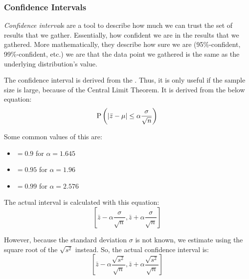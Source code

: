 \subsubsection{Confidence Intervals}\label{subsubsec:Confidence_Intervals}
\begin{definition}\label{def:Confidence_Interval}
  \emph{Confidence interval}s are a tool to describe how much we can trust the set of results that we gather.
  Essentially, how confident we are in the results that we gathered.
  More mathematically, they describe how sure we are (95\%-confident, 99\%-confident, etc.) we are that the data point we gathered is the same as the underlying distribution's value.

  The confidence interval is derived from the .
  Thus, it is only useful if the sample size is large, because of the Central Limit Theorem.
  It is derived from the below equation:
  \begin{equation}\label{eq:Confidence_Interval_Entire}
    \operatorname{\operatorname{P}} \left( \lvert \bar{z} - \mu \rvert \leq \alpha \frac{\sigma}{\sqrt{n}} \right)
  \end{equation}

  Some common values of this are:
  \begin{itemize}[noitemsep]
  \item $= 0.9$ for $\alpha = 1.645$
  \item $= 0.95$ for $\alpha = 1.96$
  \item $= 0.99$ for $\alpha = 2.576$
  \end{itemize}

  The actual interval is calculated with this equation:
  \begin{equation}\label{eq:Confidence_Interval_Sigma}
    \left[ \bar{z} - \alpha \frac{\sigma}{\sqrt{n}}, \bar{z} + \alpha \frac{\sigma}{\sqrt{n}} \right]
  \end{equation}

  However, because the standard deviation $\sigma$ is not known, we estimate using the square root of the  $\sqrt{s^{2}}$ instead.
  So, the actual confidence interval is:
  \begin{equation}\label{eq:Confidence_Interval_Sqrt_S}
    \left[ \bar{z} - \alpha \frac{\sqrt{s^{2}}}{\sqrt{n}}, \bar{z} + \alpha \frac{\sqrt{s^{2}}}{\sqrt{n}} \right]
  \end{equation}
\end{definition}
